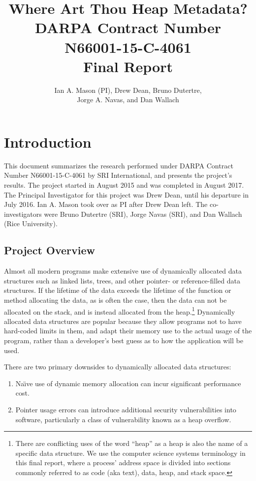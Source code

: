 \documentclass[twoside,12pt]{cslreport}
\title{{\bf Where Art Thou Heap Metadata?}\\[5mm]
\Large  DARPA Contract Number N66001-15-C-4061\\[5mm] 
Final Report}
\author{Ian A. Mason (PI), Drew Dean, Bruno Dutertre,\\
  Jorge A. Navas, and Dan Wallach}
\begin{document}
\pagestyle{plain}

\maketitle

\cleardoublepage
\tableofcontents
\listoffigures
\listoftables

\cleardoublepage


\chapter{Introduction}

This document summarizes the research performed under DARPA Contract
Number N66001-15-C-4061 by SRI International, and presents the
project's results. The project started in August 2015 and was
completed in August 2017. The Principal Investigator for this project
was Drew Dean, until his departure in July 2016. Ian A. Mason took
over as PI after Drew Dean left. The co-investigators were Bruno
Dutertre (SRI), Jorge Navas (SRI), and Dan Wallach (Rice University).


\section{Project Overview}

Almost all modern programs make extensive use of dynamically allocated
data structures  such as  linked lists, trees,  and other  pointer- or
reference-filled data structures. If the  lifetime of the data exceeds
the lifetime  of the  function or  method allocating  the data,  as is
often the case, then  the data can not be allocated  on the stack, and
is  instead allocated  from the  heap.\footnote{There are  conflicting
  uses of  the word ``heap'' as  a heap is  also the name of  a specific
  data structure. We  use the computer science  systems terminology in
  this final report, where  a process' address  space is  divided into
  sections commonly  referred to as  code (aka text), data,  heap, and
  stack  space.}  Dynamically  allocated data  structures are  popular
because they allow programs not to have hard-coded limits in them, and
adapt their memory use to the actual usage of the program, rather than
a  developer's best  guess as  to how  the application  will be  used.

There  are  two  primary   downsides  to  dynamically  allocated  data
structures:
\begin{enumerate}
\item Na\"{\i}ve use  of  dynamic  memory allocation  can  incur
significant  performance  cost.
\item Pointer usage errors can introduce additional security
  vulnerabilities into software, particularly a class of vulnerability
  known as a heap overflow.  
\end{enumerate}
\end{document}
